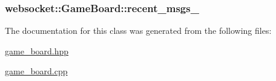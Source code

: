 \subsubsection[{\texorpdfstring{recent\+\_\+msgs\+\_\+}{recent_msgs_}}]{ websocket\+::\+Game\+Board\+::recent\+\_\+msgs\+\_\+\hspace{0.3cm}{\ttfamily [private]}}\hypertarget{classwebsocket_1_1GameBoard_a87c11dd6d2f39fa8b0100059c27179a7}{}\label{classwebsocket_1_1GameBoard_a87c11dd6d2f39fa8b0100059c27179a7}


The documentation for this class was generated from the following files\+:\begin{DoxyCompactItemize}
\item 
\hyperlink{game__board_8hpp}{game\+\_\+board.\+hpp}\item 
\hyperlink{game__board_8cpp}{game\+\_\+board.\+cpp}\end{DoxyCompactItemize}
